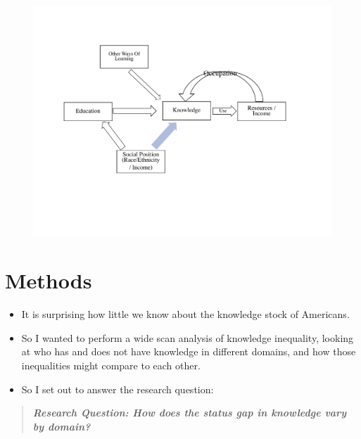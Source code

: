 \documentclass[]{article}
\begin{document}


    \begin{figure}[htb]
      \begin{center}
        \includegraphics[width=0.7\linewidth]{"Theoretical Model Drawing"}
      \end{center}
    \end{figure}

\newpage

\section{Methods}\label{methods}



\begin{itemize}
   \item{It is surprising how little we know about the knowledge stock of Americans.}
   \item{So I wanted to perform a wide scan analysis of knowledge inequality, looking at who has and does not have knowledge in different domains, and how those inequalities might compare to each other.}
  \item{So I set out to answer the research question:}
\end{itemize}

\begin{quote}
  \emph{\textbf{Research Question: How does the status gap in knowledge vary by domain?}}
\end{quote}
\end{document}
